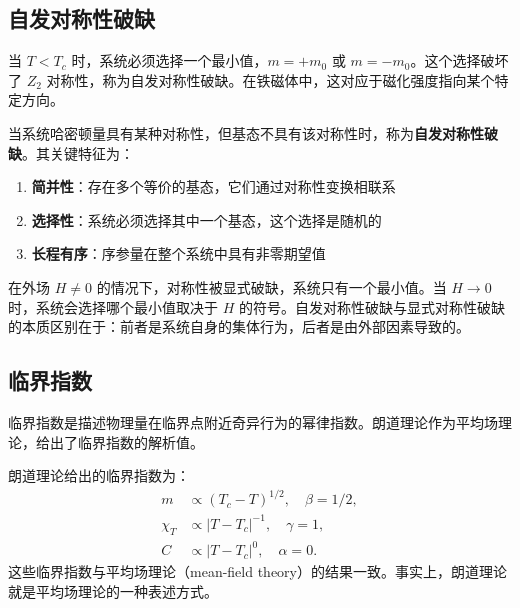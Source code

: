 \subsection{自发对称性破缺}

\begin{note}
当 $T < T_c$ 时，系统必须选择一个最小值，$m = +m_0$ 或 $m = -m_0$。这个选择破坏了 $Z_2$ 对称性，称为自发对称性破缺。在铁磁体中，这对应于磁化强度指向某个特定方向。
\end{note}

\begin{definition}[自发对称性破缺]
当系统哈密顿量具有某种对称性，但基态不具有该对称性时，称为\textbf{自发对称性破缺}。其关键特征为：
\begin{enumerate}
    \item \textbf{简并性}：存在多个等价的基态，它们通过对称性变换相联系
    \item \textbf{选择性}：系统必须选择其中一个基态，这个选择是随机的
    \item \textbf{长程有序}：序参量在整个系统中具有非零期望值
\end{enumerate}
\end{definition}

\begin{remark}
在外场 $H \neq 0$ 的情况下，对称性被显式破缺，系统只有一个最小值。当 $H \to 0$ 时，系统会选择哪个最小值取决于 $H$ 的符号。自发对称性破缺与显式对称性破缺的本质区别在于：前者是系统自身的集体行为，后者是由外部因素导致的。
\end{remark}

\subsection{临界指数}

\begin{note}
临界指数是描述物理量在临界点附近奇异行为的幂律指数。朗道理论作为平均场理论，给出了临界指数的解析值。
\end{note}

\begin{property}[朗道理论的临界指数]
朗道理论给出的临界指数为：
\begin{align}
    m &\propto (T_c - T)^{1/2}, \quad \beta = 1/2, \\
    \chi_T &\propto |T - T_c|^{-1}, \quad \gamma = 1, \\
    C &\propto |T - T_c|^{0}, \quad \alpha = 0.
\end{align}
这些临界指数与平均场理论（mean-field theory）的结果一致。事实上，朗道理论就是平均场理论的一种表述方式。
\end{property}

